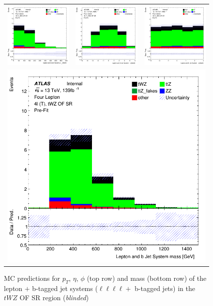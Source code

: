 \begin{figure}[htbp]
\centering
  \begin{tabular}{ccc}

    \includegraphics[width=.2\textwidth]{figures/PreFitPlots/lep4_tWZ_4T_OF_bJets_Leps_sys_pt}&
    \includegraphics[width=.2\textwidth]{figures/PreFitPlots/lep4_tWZ_4T_OF_bJets_Leps_sys_eta} &
    \includegraphics[width=.2\textwidth]{figures/PreFitPlots/lep4_tWZ_4T_OF_bJets_Leps_sys_phi} \\
    \multicolumn{3}{c}{\includegraphics[width=.2\textwidth]{figures/PreFitPlots/lep4_tWZ_4T_OF_bJets_Leps_sys_mass}}

  \end{tabular}
    \caption{MC predictions for $p_{T}$, $\eta$, $\phi$ (top row) and mass (bottom row) of the lepton $+$ b-tagged jet systems ($\ell \ell \ell \ell + $ b-tagged jets) in the $tWZ$ OF SR region (\textit{blinded})}
  \label{fig:4lep-OF-SR-bjet-and-leps-sys-Plots}
\end{figure}
\clearpage

